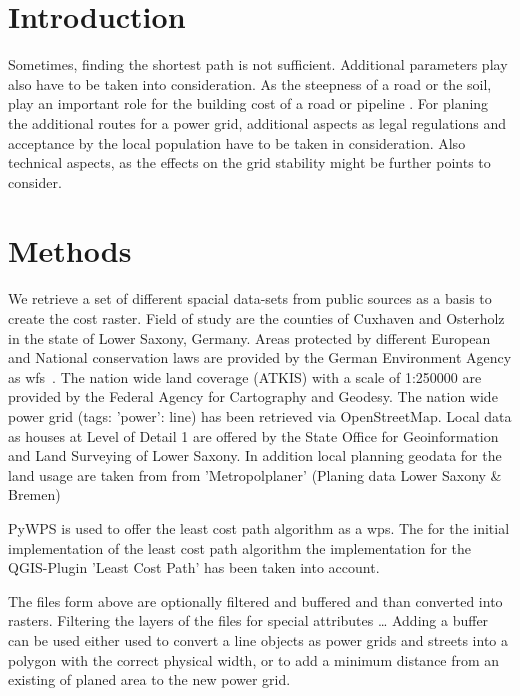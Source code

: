 \documentclass[acmtog]{acmart}
\begin{document}
	\section{Introduction}
	
	Sometimes, finding the shortest path is not sufficient. Additional parameters play also have to be taken into consideration. As the steepness of a road or the soil,
	play an important role for the building cost of a road or pipeline . For planing the additional routes for a power grid, additional aspects as legal regulations and acceptance by the local population have to be taken in consideration. Also technical aspects, as the effects on the grid stability might be further points to consider.\cite{schafer_understanding_2022}


	\section{Methods}
	We retrieve a set of different spacial data-sets from  public sources as a basis to create the cost raster. Field of study are the counties of Cuxhaven and Osterholz in the state of Lower Saxony, Germany.
	Areas protected by different European and National conservation laws are provided by the German Environment Agency as \acrfull{wfs}~\cite{noauthor_schutzgebiete_2015}. The nation wide land coverage (ATKIS) with a scale of 1:250000 are provided by the Federal Agency for Cartography and Geodesy\cite{noauthor_digitales_2021}. The nation wide power grid (tags: 'power': line) has been retrieved via OpenStreetMap.\cite{boeing_osmnx_2017}
	Local data as houses at Level of Detail 1 are offered by the State Office for Geoinformation and Land Surveying of Lower Saxony\cite{noauthor_opengeodatani_2022}. In addition local planning geodata for the land usage are taken from 
	from 'Metropolplaner' (Planing data Lower Saxony \& Bremen)\cite{noauthor_metropolplaner_2022}
	
	PyWPS\cite{noauthor_welcome_2016} is used to offer the least cost path algorithm as a \acrfull{wps}.
	The for the initial implementation of the least cost path algorithm the implementation for the QGIS-Plugin 'Least Cost Path'\cite{noauthor_leastcostpathdijkstra_algorithmpy_2022} has been taken into account.
	
	The files form above are optionally filtered and buffered and than converted into rasters. Filtering the layers of the files for special attributes \ldots
	 Adding a buffer can be used either used to convert a line objects as power grids and streets into a polygon with the correct physical width, or to add a minimum distance from an existing of planed area to the new power grid.
	
\end{document}
